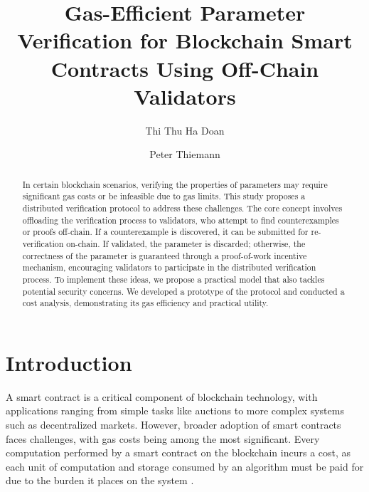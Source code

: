 \documentclass[runningheads]{llncs}
\begin{document}
%
\title{Gas-Efficient Parameter Verification for Blockchain Smart Contracts Using Off-Chain Validators}
%
%
\author{Thi Thu Ha Doan\and Peter Thiemann}
%
%
%
\maketitle              %
%
\begin{abstract}
In certain blockchain scenarios, verifying the properties of parameters may require significant gas costs or be infeasible due to gas limits. This study proposes a distributed verification protocol to address these challenges. The core concept involves offloading the verification process to validators, who attempt to find counterexamples or proofs off-chain. If a counterexample is discovered, it can be submitted for re-verification on-chain. If validated, the parameter is discarded; otherwise, the correctness of the parameter is guaranteed through a proof-of-work incentive mechanism, encouraging validators to participate in the distributed verification process. To implement these ideas, we propose a practical model that also tackles potential security concerns. We developed a prototype of the protocol and conducted a cost analysis, demonstrating its gas efficiency and practical utility.
\end{abstract}
%
%
%
\section{Introduction}
\label{sec:introduction}
\lstset{language=solidity}
A smart contract is a critical component of blockchain technology, with applications ranging from simple tasks like auctions to more complex systems such as decentralized markets. However, broader adoption of smart contracts faces challenges, with gas costs being among the most significant. Every computation performed by a smart contract on the blockchain incurs a cost, as each unit of computation and storage consumed by an algorithm must be paid for due to the burden it places on the system \cite{eth-whitepaper,yellowpaper}.
\end{document}

